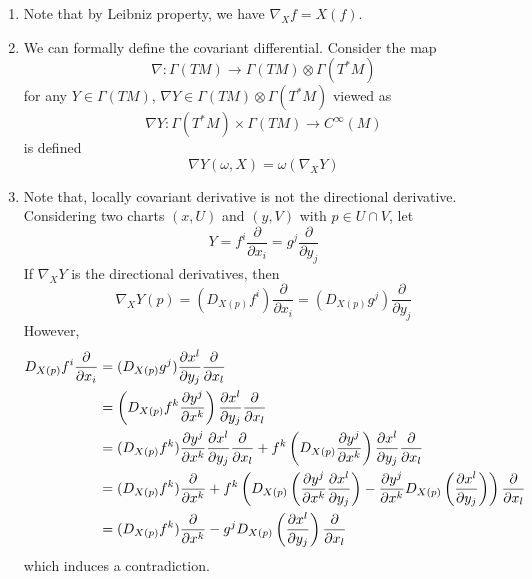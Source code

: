 \begin{rmk}
	\begin{enumerate}[label=(\arabic{*})]
		\item Note that by Leibniz property, we have $\nabla_Xf = X(f)$.
		\item We can formally define the covariant differential. Consider the map
		\begin{equation*}
			\nabla \colon \Gamma(TM) \longrightarrow \Gamma(TM)\otimes \Gamma(T^*M)
		\end{equation*}
		for any $Y \in \Gamma(TM)$, $\nabla Y \in \Gamma(TM)\otimes \Gamma(T^*M)$ viewed as
		\begin{equation*}
			\nabla Y \colon \Gamma(T^*M)\times \Gamma(TM) \longrightarrow C^\infty(M)
		\end{equation*}
		is defined
		\begin{equation*}
			\nabla Y(\omega,X) = \omega(\nabla_XY)
		\end{equation*}

		\item Note that, locally covariant derivative is not the directional derivative. Considering two charts $(x,U)$ and $(y,V)$ with $p \in U \cap V$, let
		\begin{equation*}
			Y = f^i\frac{\partial}{\partial x_i} = g^j \frac{\partial}{\partial y_j}
		\end{equation*}
		If $\nabla_XY$ is the directional derivatives, then
		\begin{equation*}
			\nabla_XY(p) =(D_{X(p)}f^i) \frac{\partial}{\partial x_i} = (D_{X(p)}g^j) \frac{\partial}{\partial y_j}
		\end{equation*}
		However,
		\begin{equation*}
			\begin{aligned}
				D_{X(p)}f^i \frac{\partial}{\partial x_i} &= (D_{X(p)}g^j)   \frac{\partial x^l}{\partial y_j}\frac{\partial}{\partial x_l} 
				\\
				&= \left(D_{X(p)} f^k \frac{\partial y^j}{\partial x^k} \right) \frac{\partial x^l}{\partial y_j}\frac{\partial}{\partial x_l} \\
				&= (D_{X(p)} f^k)\frac{\partial y^j}{\partial x^k}\frac{\partial x^l}{\partial y_j}\frac{\partial}{\partial x_l} + f^k\left(D_{X(p)} \frac{\partial y^j}{\partial x^k}\right)\frac{\partial x^l}{\partial y_j}\frac{\partial}{\partial x_l} \\
				&= (D_{X(p)} f^k)\frac{\partial}{\partial x^k} + f^k\left(D_{X(p)}\left(\frac{\partial y^j}{\partial x^k} \frac{\partial x^l}{\partial y_j}\right)- \frac{\partial y^j}{\partial x^k}D_{X(p)}\left(\frac{\partial x^l}{\partial y_j}\right)\right)\frac{\partial}{\partial x_l} \\
				&= (D_{X(p)} f^k)\frac{\partial}{\partial x^k} - g^jD_{X(p)}\left(\frac{\partial x^l}{\partial y_j}\right)\frac{\partial}{\partial x_l}
			\end{aligned}
		\end{equation*}
		which induces a contradiction.
	\end{enumerate}
\end{rmk}
